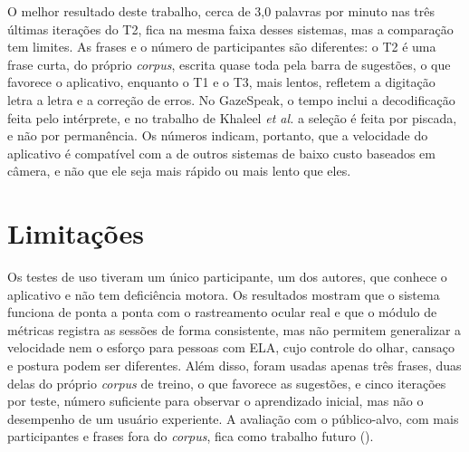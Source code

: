 O melhor resultado deste trabalho, cerca de 3,0 palavras por minuto nas três últimas iterações do T2, fica na mesma faixa desses sistemas, mas a comparação tem limites. As frases e o número de participantes são diferentes: o T2 é uma frase curta, do próprio \textit{corpus}, escrita quase toda pela barra de sugestões, o que favorece o aplicativo, enquanto o T1 e o T3, mais lentos, refletem a digitação letra a letra e a correção de erros. No GazeSpeak, o tempo inclui a decodificação feita pelo intérprete, e no trabalho de Khaleel \textit{et al.} a seleção é feita por piscada, e não por permanência. Os números indicam, portanto, que a velocidade do aplicativo é compatível com a de outros sistemas de baixo custo baseados em câmera, e não que ele seja mais rápido ou mais lento que eles.

\section{Limitações} \label{sec:res_limitacoes}

Os testes de uso tiveram um único participante, um dos autores, que conhece o aplicativo e não tem deficiência motora. Os resultados mostram que o sistema funciona de ponta a ponta com o rastreamento ocular real e que o módulo de métricas registra as sessões de forma consistente, mas não permitem generalizar a velocidade nem o esforço para pessoas com \gls{ELA}, cujo controle do olhar, cansaço e postura podem ser diferentes. Além disso, foram usadas apenas três frases, duas delas do próprio \textit{corpus} de treino, o que favorece as sugestões, e cinco iterações por teste, número suficiente para observar o aprendizado inicial, mas não o desempenho de um usuário experiente. A avaliação com o público-alvo, com mais participantes e frases fora do \textit{corpus}, fica como trabalho futuro ().
